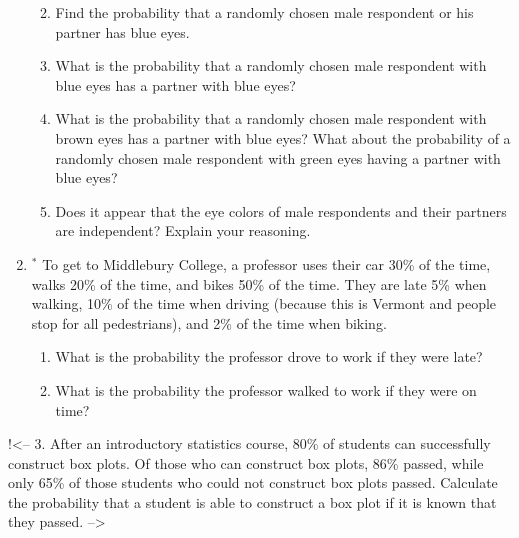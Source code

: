 \documentclass[
  letterpaper,
  DIV=11,
  numbers=noendperiod]{scrartcl}
\providecommand{\tightlist}{%
  \setlength{\itemsep}{0pt}\setlength{\parskip}{0pt}}\usepackage{longtable,booktabs,array}
\begin{document}
\begin{enumerate}
  \begin{enumerate}
  \def\labelenumii{\alph{enumii}.}
  \tightlist
  \item
    Find the probability that a randomly chosen male respondent or his
    partner has blue eyes.
  \item
    What is the probability that a randomly chosen male respondent with
    blue eyes has a partner with blue eyes?
  \item
    What is the probability that a randomly chosen male respondent with
    brown eyes has a partner with blue eyes? What about the probability
    of a randomly chosen male respondent with green eyes having a
    partner with blue eyes?
  \item
    Does it appear that the eye colors of male respondents and their
    partners are independent? Explain your reasoning.
  \end{enumerate}
\item
  \(^*\) To get to Middlebury College, a professor uses their car 30\%
  of the time, walks 20\% of the time, and bikes 50\% of the time. They
  are late 5\% when walking, 10\% of the time when driving (because this
  is Vermont and people stop for all pedestrians), and 2\% of the time
  when biking.

  \begin{enumerate}
  \def\labelenumii{\alph{enumii}.}
  \tightlist
  \item
    What is the probability the professor drove to work if they were
    late?
  \item
    What is the probability the professor walked to work if they were on
    time?
  \end{enumerate}
\end{enumerate}

!\textless-- 3. After an introductory statistics course, 80\% of
students can successfully construct box plots. Of those who can
construct box plots, 86\% passed, while only 65\% of those students who
could not construct box plots passed. Calculate the probability that a
student is able to construct a box plot if it is known that they passed.
--\textgreater{}
\end{document}
